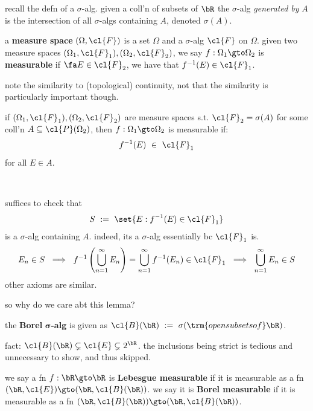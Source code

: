 recall the defn of a $\sigma$-alg.
given a coll'n of subsets of $\bR$ the $\sigma$-alg \textit{generated by} $A$ is
the intersection of all $\sigma$-algs containing $A$, denoted $\sigma(A)$.

\begin{defn}
	a \textbf{measure space} $(\Omega,\cl{F})$ is a set $\Omega$ and a $\sigma$-alg $\cl{F}$ on $\Omega$.
	given two measure spaces $(\Omega_{1},\cl{F}_{1}),(\Omega_{2},\cl{F}_{2})$,
	we say $f:\Omega_{1}\gto\Omega_{2}$ is \textbf{measurable} if $\fa E\in\cl{F}_{2}$,
	we have that $f^{-1}(E)\in\cl{F}_{1}$.
\end{defn}
note the similarity to (topological) continuity,
not that the similarity is particularly important though.

\begin{lm}
	if $(\Omega_{1},\cl{F}_{1}),(\Omega_{2},\cl{F}_{2})$ are measure spaces
	s.t. $\cl{F}_{2}=\sigma(A)$ for some coll'n $A\subseteq\cl{P}(\Omega_{2})$,
	then $f:\Omega_{1}\gto\Omega_{2}$ is measurable if:
	\begin{equation*}
		f^{-1}(E) \ \in \ \cl{F}_{1}
	\end{equation*}
	for all $E\in A$.
\end{lm} \

\begin{pf}
	suffices to check that
	\begin{equation*}
		S \ := \ \set{E:f^{-1}(E)\in\cl{F}_{1}}
	\end{equation*}
	is a $\sigma$-alg containing $A$.
	indeed, its a $\sigma$-alg essentially bc $\cl{F}_{1}$ is.
	\begin{equation*}
		E_{n}\in S \ \implies \ f^{-1}\left(\bigcup_{n=1}^{\infty}E_{n}\right)
		= \bigcup_{n=1}^{\infty}f^{-1}(E_{n}) \in \cl{F}_{1}
		\ \implies \ \bigcup_{n=1}^{\infty}E_{n}\in S
	\end{equation*}
	other axioms are similar.
\end{pf}
so why do we care abt this lemma?

\begin{defn}
	the \textbf{Borel} $\bm{\sigma}$\textbf{-alg} is given as
	$\cl{B}(\bR) \ := \ \sigma(\trm{open subsets of } \bR)$.
\end{defn}
fact: $\cl{B}(\bR)\subsetneq\cl{E}\subsetneq2^{\bR}$.
the inclusions being strict is tedious and unnecessary to show,
and thus skipped.

\begin{defn}
	we say a fn $f:\bR\gto\bR$ is \textbf{Lebesgue measurable} if it is measurable as
	a fn $(\bR,\cl{E})\gto(\bR,\cl{B}(\bR))$.
	we say it is \textbf{Borel measurable} if it is measurable as
	a fn $(\bR,\cl{B}(\bR))\gto(\bR,\cl{B}(\bR))$.
\end{defn} \

